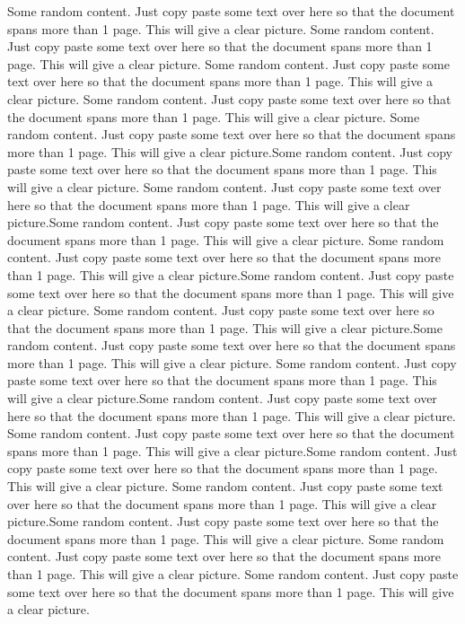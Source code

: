 \documentclass{article}
\begin{document}
	Some random content. Just copy paste some text over here so that the document spans more than 1 page. This will give a clear picture.
	Some random content. Just copy paste some text over here so that the document spans more than 1 page. This will give a clear picture.
	Some random content. Just copy paste some text over here so that the document spans more than 1 page. This will give a clear picture.
	Some random content. Just copy paste some text over here so that the document spans more than 1 page. This will give a clear picture.
	Some random content. Just copy paste some text over here so that the document spans more than 1 page. This will give a clear picture.Some random content. Just copy paste some text over here so that the document spans more than 1 page. This will give a clear picture.
	Some random content. Just copy paste some text over here so that the document spans more than 1 page. This will give a clear picture.Some random content. Just copy paste some text over here so that the document spans more than 1 page. This will give a clear picture.
	Some random content. Just copy paste some text over here so that the document spans more than 1 page. This will give a clear picture.Some random content. Just copy paste some text over here so that the document spans more than 1 page. This will give a clear picture.
	Some random content. Just copy paste some text over here so that the document spans more than 1 page. This will give a clear picture.Some random content. Just copy paste some text over here so that the document spans more than 1 page. This will give a clear picture.
	Some random content. Just copy paste some text over here so that the document spans more than 1 page. This will give a clear picture.Some random content. Just copy paste some text over here so that the document spans more than 1 page. This will give a clear picture.
	Some random content. Just copy paste some text over here so that the document spans more than 1 page. This will give a clear picture.Some random content. Just copy paste some text over here so that the document spans more than 1 page. This will give a clear picture.
	Some random content. Just copy paste some text over here so that the document spans more than 1 page. This will give a clear picture.Some random content. Just copy paste some text over here so that the document spans more than 1 page. This will give a clear picture.
	Some random content. Just copy paste some text over here so that the document spans more than 1 page. This will give a clear picture.
	Some random content. Just copy paste some text over here so that the document spans more than 1 page. This will give a clear picture.
\end{document}
